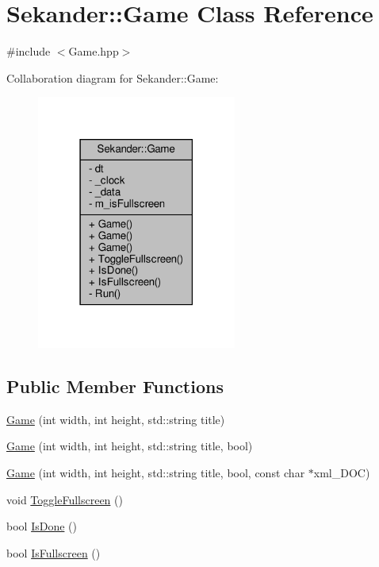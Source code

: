 \hypertarget{classSekander_1_1Game}{}\section{Sekander\+:\+:Game Class Reference}
\label{classSekander_1_1Game}


{\ttfamily \#include $<$Game.\+hpp$>$}



Collaboration diagram for Sekander\+:\+:Game\+:
\nopagebreak
\begin{figure}[H]
\begin{center}
\leavevmode
\includegraphics[width=186pt]{classSekander_1_1Game__coll__graph}
\end{center}
\end{figure}
\subsection*{Public Member Functions}
\begin{DoxyCompactItemize}
\item 
\hyperlink{classSekander_1_1Game_a53c182b8b8b63723740aaef1b0cc25a0}{Game} (int width, int height, std\+::string title)
\item 
\hyperlink{classSekander_1_1Game_afe9c8ee4d47148de8fed696efe7bd9ac}{Game} (int width, int height, std\+::string title, bool)
\item 
\hyperlink{classSekander_1_1Game_a187c141c1b8b70416dccfbfb15d2a3db}{Game} (int width, int height, std\+::string title, bool, const char $\ast$xml\+\_\+\+D\+OC)
\item 
void \hyperlink{classSekander_1_1Game_a2bf4207f57e28e619fcdf383079c3a9d}{Toggle\+Fullscreen} ()
\item 
bool \hyperlink{classSekander_1_1Game_a70fe3c4cc2af6708dc19ffd54a782283}{Is\+Done} ()
\item 
bool \hyperlink{classSekander_1_1Game_aa919e9a5695d21c1ab19b2c8abe54041}{Is\+Fullscreen} ()
\end{DoxyCompactItemize}
